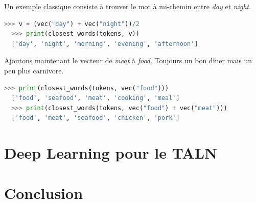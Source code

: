 \documentclass[11pt, a4paper]{report}
\begin{document}
Un exemple classique consiste à trouver le mot à mi-chemin entre \textit{day} et 
\textit{night}.
\begin{lstlisting}[language=Python]
  >>> v = (vec("day") + vec("night"))/2
  >>> print(closest_words(tokens, v))
  ['day', 'night', 'morning', 'evening', 'afternoon']
\end{lstlisting}  

Ajoutons maintenant le vecteur de \textit{meat} à \textit{food}.
Toujours un bon dîner mais un peu plus carnivore. 
\begin{lstlisting}[language=Python]
  >>> print(closest_words(tokens, vec("food")))
  ['food', 'seafood', 'meat', 'cooking', 'meal']
  >>> print(closest_words(tokens, vec("food") + vec("meat")))
  ['food', 'meat', 'seafood', 'chicken', 'pork']
\end{lstlisting}  

\chapter{Deep Learning pour le TALN}
\chapter{Conclusion}



\end{document}

